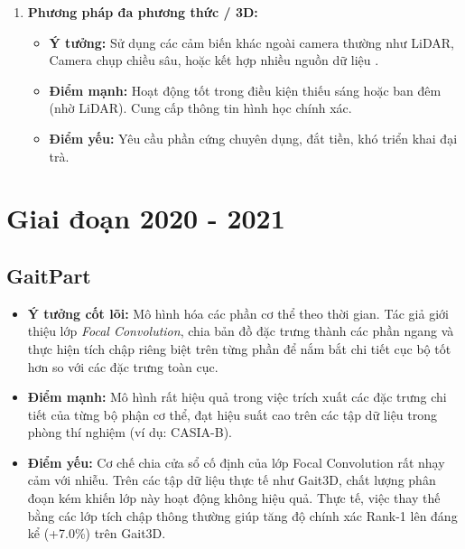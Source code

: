 \begin{enumerate}
  \item \textbf{Phương pháp đa phương thức / 3D:}
        \begin{itemize}
          \item \textbf{Ý tưởng:} Sử dụng các cảm biến khác ngoài camera thường như LiDAR, Camera chụp chiều sâu, hoặc kết hợp nhiều nguồn dữ liệu \cite{shen2023lidargaitbenchmarking3dgait}.
          \item \textbf{Điểm mạnh:} Hoạt động tốt trong điều kiện thiếu sáng hoặc ban đêm (nhờ LiDAR). Cung cấp thông tin hình học chính xác.
          \item \textbf{Điểm yếu:} Yêu cầu phần cứng chuyên dụng, đắt tiền, khó triển khai đại trà.
        \end{itemize}
\end{enumerate}

\section{Giai đoạn 2020 - 2021}
\label{sec:related_work_20_21}

\subsection{GaitPart \cite{fan2020gaitpart}}
\begin{itemize}
  \item \textbf{Ý tưởng cốt lõi:}
        Mô hình hóa các phần cơ thể theo thời gian. Tác giả giới thiệu lớp \textit{Focal Convolution}, chia bản đồ đặc trưng thành các phần ngang và thực hiện tích chập riêng biệt trên từng phần để nắm bắt chi tiết cục bộ tốt hơn so với các đặc trưng toàn cục.

  \item \textbf{Điểm mạnh:}
        Mô hình rất hiệu quả trong việc trích xuất các đặc trưng chi tiết của từng bộ phận cơ thể, đạt hiệu suất cao trên các tập dữ liệu trong phòng thí nghiệm (ví dụ: CASIA-B).

  \item \textbf{Điểm yếu:}
        Cơ chế chia cửa sổ cố định của lớp Focal Convolution rất nhạy cảm với nhiễu. Trên các tập dữ liệu thực tế như Gait3D, chất lượng phân đoạn kém khiến lớp này hoạt động không hiệu quả. Thực tế, việc thay thế bằng các lớp tích chập thông thường giúp tăng độ chính xác Rank-1 lên đáng kể (+7.0\%) trên Gait3D.
\end{itemize}

